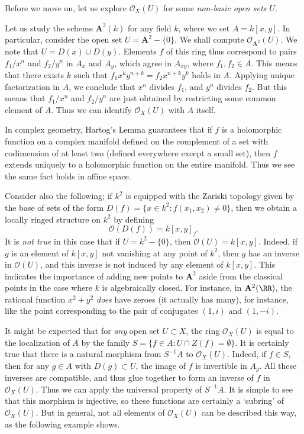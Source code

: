 Before we move on, let us explore $\mathcal{O}_X(U)$ for some \emph{non-basic open sets $U$}.

\begin{example}
    Let us study the scheme $\mathbf{A}^2(k)$ for any field $k$, where we set $A = k[x,y]$. In particular, consider the open set $U = \mathbf{A}^2 - \{ 0 \}$. We shall compute $\mathcal{O}_{\mathbf{A}^2}(U)$. We note that $U = D(x) \cup D(y)$. Elements $f$ of this ring thus correspond to pairs $f_1/x^n$ and $f_2/y^n$ in $A_x$ and $A_y$, which agree in $A_{xy}$, where $f_1,f_2 \in A$. This means that there exists $k$ such that $f_1x^ky^{n+k} = f_2x^{n+k} y^k$ holds in $A$. Applying unique factorization in $A$, we conclude that $x^n$ divides $f_1$, and $y^n$ divides $f_2$. But this means that $f_1/x^n$ and $f_2/y^n$ are just obtained by restricting some common element of $A$. Thus we can identify $\mathcal{O}_X(U)$ with $A$ itself.

    In complex geometry, Hartog's Lemma guarantees that if $f$ is a holomorphic function on a complex manifold defined on the complement of a set with codimension of at least two (defined everywhere except a small set), then $f$ extends uniquely to a holomorphic function on the entire manifold. Thus we see the same fact holds in affine space.

    Consider also the following; if $k^2$ is equipped with the Zariski topology given by the base of sets of the form $D(f) = \{ x \in k^2: f(x_1,x_2) \neq 0 \}$, then we obtain a locally ringed structure on $k^2$ by defining
    \[ \mathcal{O}(D(f)) = k[x,y]_{f}. \]
    It is \emph{not true} in this case that if $U = k^2 - \{ 0 \}$, then $\mathcal{O}(U) = k[x,y]$. Indeed, if $g$ is an element of $k[x,y]$ not vanishing at any point of $k^2$, then $g$ has an inverse in $\mathcal{O}(U)$, and this inverse is not induced by any element of $k[x,y]$. This indicates the importance of adding new points to $\mathbf{A}^2$ aside from the classical points in the case where $k$ is algebraically closed. For instance, in $\mathbf{A}^2(\RR)$, the rational function $x^2 + y^2$ \emph{does} have zeroes (it actually has many), for instance, like the point corresponding to the pair of conjugates $(1,i)$ and $(1,-i)$.
\end{example}

It might be expected that for \emph{any} open set $U \subset X$, the ring $\mathcal{O}_X(U)$ is equal to the localization of $A$ by the family $S = \{ f \in A: U \cap Z(f) = \emptyset \}$. It is certainly true that there is a natural morphism from $S^{-1}A$ to $\mathcal{O}_X(U)$. Indeed, if $f \in S$, then for any $g \in A$ with $D(g) \subset U$, the image of $f$ is invertible in $A_g$. All these inverses are compatible, and thus glue together to form an inverse of $f$ in $\mathcal{O}_X(U)$. Thus we can apply the universal property of $S^{-1}A$. It is simple to see that this morphism is injective, so these functions are certainly a `subring' of $\mathcal{O}_X(U)$. But in general, not all elements of $\mathcal{O}_X(U)$ can be described this way, as the following example shows.

